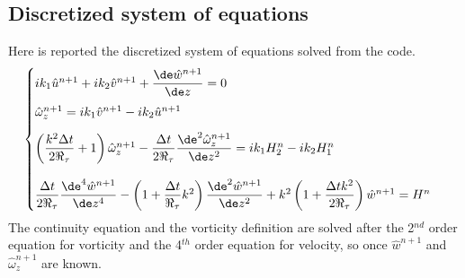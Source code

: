 \subsection{Discretized system of equations}
Here is reported the discretized system of equations solved from the code.
\begin{equation}
\begin{cases}
ik_1\hat u^{n+1}+ik_2\hat v^{n+1}+\dfrac{\de \hat w^{n+1}}{\de z}=0\\[2ex]
\hat \omega_z^{n+1}=ik_1\hat v^{n+1}-ik_2\hat u^{n+1}\\[2ex]
\left(\dfrac{k^2\Delta t}{2\Re_\tau}+1 \right)\hat\omega_z^{n+1}-\dfrac{\Delta t}{2\Re_\tau}\dfrac{\de^2 \hat\omega_z^{n+1}}{\de z^2}=ik_1H_2^n-ik_2H_1^n\\[4ex]
\dfrac{\Delta t}{2\Re_\tau}\dfrac{\de^4\hat w^{n+1}}{\de z^4}-\left(1+\dfrac{\Delta t}{\Re_\tau}k^2 \right)\dfrac{\de^2 \hat w^{n+1}}{\de z^2}+ k^2\left(1+\dfrac{\Delta t k^2}{2\Re_\tau} \right)\hat w^{n+1}=H^n
\end{cases}
\end{equation}
The continuity equation and the vorticity definition are solved after the 2$^{nd}$ order equation for vorticity and the 4$^{th}$ order equation for velocity, so once $\hat w^{n+1}$ and $\hat \omega_z^{n+1}$ are known.













